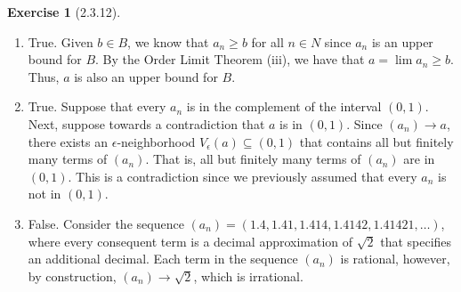 \documentclass{amsart}
\theoremstyle{definition}
\newtheorem{exercise}{Exercise}
\begin{document}
\begin{exercise}[2.3.12]
  \begin{enumerate}[label={(\alph*)}]
    \item True. Given $b \in B$, we know that $a_n \ge b$ for all $n \in N$
      since $a_n$ is an upper bound for $B$. By the Order Limit Theorem (iii),
      we have that $a = \lim{a_n} \ge b$. Thus, $a$ is also an upper bound for
      $B$.
    \item True. Suppose that every $a_n$ is in the complement of the interval
      $(0,1)$. Next, suppose towards a contradiction that $a$ is in $(0,1)$.
      Since $(a_n) \rightarrow a$, there exists an $\epsilon$-neighborhood
      $V_\epsilon(a) \subseteq (0,1)$ that contains all but finitely many terms
      of $(a_n)$. That is, all but finitely many terms of $(a_n)$ are in
      $(0,1)$. This is a contradiction since we previously assumed that every
      $a_n$ is not in $(0,1)$.
    \item False. Consider the sequence $(a_n) = (1.4, 1.41, 1.414, 1.4142,
      1.41421, \ldots)$, where every consequent term is a decimal approximation
      of $\sqrt{2}$ that specifies an additional decimal. Each term in the
      sequence $(a_n)$ is rational, however, by construction, $(a_n) \rightarrow
      \sqrt{2}$, which is irrational.
  \end{enumerate}
\end{exercise}
\end{document}
